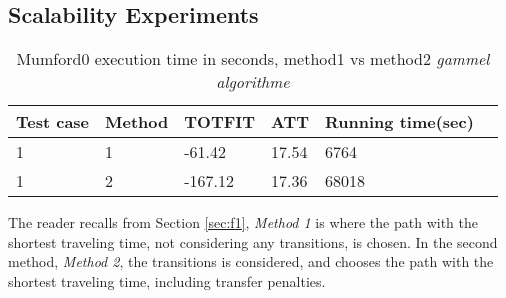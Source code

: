\subsection{Scalability Experiments}
\label{subsec:scalabilityExperiments_results}

\begin{table}[H]
    \centering
    \begin{tabular}{|l|l|l|l|l|l|}
        \hline
        Test case & Method & TOTFIT & ATT & Running time(sec) \\
        \hline
        1 & 1 & -61.42 & 17.54 & 6764 \\
        1 & 2 & -167.12 & 17.36 & 68018 \\
        
        \hline
    \end{tabular}
    \caption{Mumford0 execution time in seconds, method1 vs method2 \emph{\color{blue} gammel algorithme}}
    \label{table:results_mumford}
\end{table}

The reader recalls from Section \vref{sec:f1},  \textit{Method 1} is where the path with the shortest traveling time, not considering any transitions, is chosen. In the second method, \textit{Method 2}, the transitions is considered, and chooses the path with the shortest traveling time, including transfer penalties.





